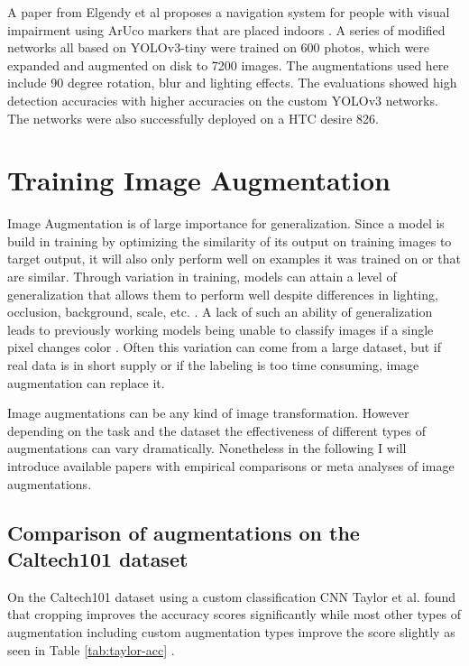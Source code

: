 \documentclass[10pt]{book}
\begin{document}
A paper from Elgendy et al proposes a navigation system for people with visual impairment using \ac{ArUco} markers that are placed indoors \cite{elgendy2021novel}. A series of modified networks all based on \ac{YOLO}v3-tiny were trained on 600 photos, which were expanded and augmented on disk to 7200 images. The augmentations used here include 90 degree rotation, blur and lighting effects. The evaluations showed high detection accuracies with higher accuracies on the custom \ac{YOLO}v3 networks. The networks were also successfully deployed on a HTC desire 826.

\section{Training Image Augmentation}

Image Augmentation is of large importance for generalization. Since a model is build in training by optimizing the similarity of its output on training images to target output, it will also only perform well on examples it was trained on or that are similar. Through variation in training, models can attain a level of generalization that allows them to perform well despite differences in lighting, occlusion, background, scale, etc. \cite{shorten2019survey}. A lack of such an ability of generalization leads to previously working models being unable to classify images if a single pixel changes color \cite{8601309}. Often this variation can come from a large dataset, but if real data is in short supply or if the labeling is too time consuming, image augmentation can replace it.

Image augmentations can be any kind of image transformation. However depending on the task and the dataset the effectiveness of different types of augmentations can vary dramatically. Nonetheless in the following I will introduce available papers with empirical comparisons or meta analyses of image augmentations.

\subsection{Comparison of augmentations on the Caltech101 dataset}

On the Caltech101 dataset using a custom classification \ac{CNN} Taylor et al. found that cropping improves the accuracy scores significantly while most other types of augmentation including custom augmentation types improve the score slightly as seen in Table \ref{tab:taylor-acc} \cite{8628742}.
\end{document}
